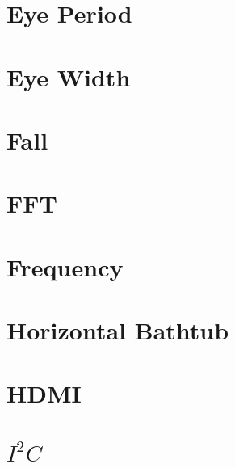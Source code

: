 \section{Eye Period}

\pagebreak
\section{Eye Width}

\pagebreak
\section{Fall}

\pagebreak
\section{FFT}

\pagebreak
\section{Frequency}

\pagebreak
\section{Horizontal Bathtub}

\pagebreak
\section{HDMI}
\label{filter:hdmi}

\pagebreak
\section{$I^2C$}

